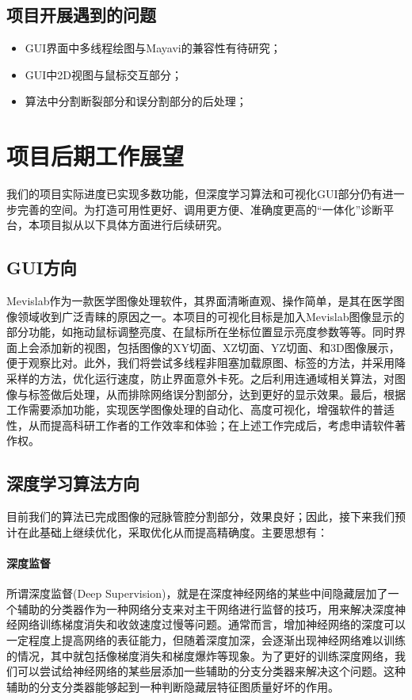 \documentclass[lang=cn,11pt,a4paper,cite=numbers]{elegantpaper}
\begin{document}
\subsection{项目开展遇到的问题}

\begin{itemize}
    \item GUI界面中多线程绘图与Mayavi的兼容性有待研究；
    \item GUI中2D视图与鼠标交互部分；
    \item 算法中分割断裂部分和误分割部分的后处理；
\end{itemize}

\section{项目后期工作展望}

我们的项目实际进度已实现多数功能，但深度学习算法和可视化GUI部分仍有进一步完善的空间。为打造可用性更好、调用更方便、准确度更高的“一体化”诊断平台，本项目拟从以下具体方面进行后续研究。

\subsection{GUI方向}

Mevislab作为一款医学图像处理软件，其界面清晰直观、操作简单，是其在医学图像领域收到广泛青睐的原因之一。本项目的可视化目标是加入Mevislab图像显示的部分功能，如拖动鼠标调整亮度、在鼠标所在坐标位置显示亮度参数等等。同时界面上会添加新的视图，包括图像的XY切面、XZ切面、YZ切面、和3D图像展示，便于观察比对。此外，我们将尝试多线程非阻塞加载原图、标签的方法，并采用降采样的方法，优化运行速度，防止界面意外卡死。之后利用连通域相关算法，对图像与标签做后处理，从而排除网络误分割部分，达到更好的显示效果。最后，根据工作需要添加功能，实现医学图像处理的自动化、高度可视化，增强软件的普适性，从而提高科研工作者的工作效率和体验；在上述工作完成后，考虑申请软件著作权。

\subsection{深度学习算法方向}

目前我们的算法已完成图像的冠脉管腔分割部分，效果良好；因此，接下来我们预计在此基础上继续优化，采取优化从而提高精确度。主要思想有：

\paragraph{深度监督}
所谓深度监督(Deep Supervision)，就是在深度神经网络的某些中间隐藏层加了一个辅助的分类器作为一种网络分支来对主干网络进行监督的技巧，用来解决深度神经网络训练梯度消失和收敛速度过慢等问题。通常而言，增加神经网络的深度可以一定程度上提高网络的表征能力，但随着深度加深，会逐渐出现神经网络难以训练的情况，其中就包括像梯度消失和梯度爆炸等现象。为了更好的训练深度网络，我们可以尝试给神经网络的某些层添加一些辅助的分支分类器来解决这个问题。这种辅助的分支分类器能够起到一种判断隐藏层特征图质量好坏的作用。
\end{document}
